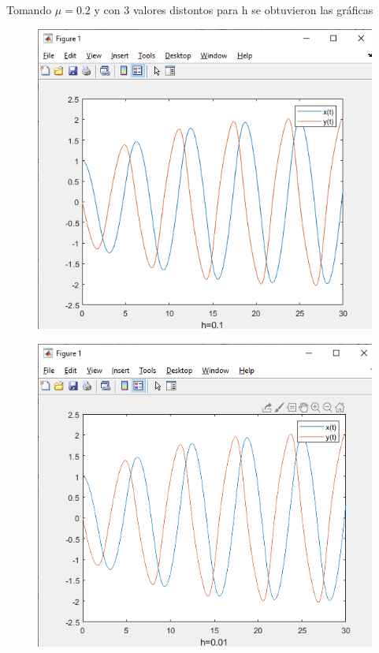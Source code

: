 \documentclass[12pt]{article}
\begin{document}
Tomando $\mu = 0.2$ y con 3 valores distontos para h se obtuvieron las gráficas
\begin{figure}[h]
	\centering
	\caption{}
	\includegraphics[scale=0.45]{graf5.png}
	\label{graf5}
\end{figure}
\begin{figure}[h]
	\centering
	\caption{}
	\includegraphics[scale=0.45]{graf6.png}
	\label{graf6}
\end{figure}
\end{document}
